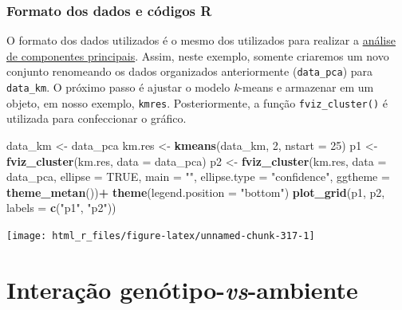 \documentclass[
]{book}
\newenvironment{Shaded}{\begin{snugshade}}{\end{snugshade}}
\newcommand{\DataTypeTok}[1]{\textcolor[rgb]{0.13,0.29,0.53}{#1}}
\newcommand{\DecValTok}[1]{\textcolor[rgb]{0.00,0.00,0.81}{#1}}
\newcommand{\KeywordTok}[1]{\textcolor[rgb]{0.13,0.29,0.53}{\textbf{#1}}}
\newcommand{\NormalTok}[1]{#1}
\newcommand{\OperatorTok}[1]{\textcolor[rgb]{0.81,0.36,0.00}{\textbf{#1}}}
\newcommand{\OtherTok}[1]{\textcolor[rgb]{0.56,0.35,0.01}{#1}}
\newcommand{\StringTok}[1]{\textcolor[rgb]{0.31,0.60,0.02}{#1}}
\numberwithin{equation}{section}
\begin{document}
\hypertarget{formato-dos-dados-e-cuxf3digos-r}{%
\subsection{Formato dos dados e códigos R}\label{formato-dos-dados-e-cuxf3digos-r}}

O formato dos dados utilizados é o mesmo dos utilizados para realizar a \protect\hyperlink{componentes-principais}{análise de componentes principais}. Assim, neste exemplo, somente criaremos um novo conjunto renomeando os dados organizados anteriormente (\texttt{data\_pca}) para \texttt{data\_km}. O próximo passo é ajustar o modelo \emph{k}-means e armazenar em um objeto, em nosso exemplo, \texttt{kmres}. Posteriormente, a função \texttt{fviz\_cluster()} é utilizada para confeccionar o gráfico.

\begin{Shaded}
\begin{Highlighting}[]
\NormalTok{data\_km \textless{}{-}}\StringTok{ }\NormalTok{data\_pca}
\NormalTok{km.res \textless{}{-}}\StringTok{ }\KeywordTok{kmeans}\NormalTok{(data\_km, }\DecValTok{2}\NormalTok{, }\DataTypeTok{nstart =} \DecValTok{25}\NormalTok{)}
\NormalTok{p1 \textless{}{-}}\StringTok{ }\KeywordTok{fviz\_cluster}\NormalTok{(km.res, }\DataTypeTok{data =}\NormalTok{ data\_pca)}
\NormalTok{p2 \textless{}{-}}\StringTok{ }\KeywordTok{fviz\_cluster}\NormalTok{(km.res,}
                   \DataTypeTok{data =}\NormalTok{ data\_pca,}
                   \DataTypeTok{ellipse =} \OtherTok{TRUE}\NormalTok{,}
                   \DataTypeTok{main =} \StringTok{""}\NormalTok{,}
                   \DataTypeTok{ellipse.type =} \StringTok{"confidence"}\NormalTok{,}
                   \DataTypeTok{ggtheme =} \KeywordTok{theme\_metan}\NormalTok{())}\OperatorTok{+}
\StringTok{      }\KeywordTok{theme}\NormalTok{(}\DataTypeTok{legend.position =} \StringTok{"bottom"}\NormalTok{)}
\KeywordTok{plot\_grid}\NormalTok{(p1, p2, }\DataTypeTok{labels =} \KeywordTok{c}\NormalTok{(}\StringTok{"p1"}\NormalTok{, }\StringTok{"p2"}\NormalTok{))}
\end{Highlighting}
\end{Shaded}

\begin{center}\texttt{[image: html\_r\_files/figure-latex/unnamed-chunk-317-1]} \end{center}

\hypertarget{interaction}{%
\chapter{\texorpdfstring{Interação genótipo-\emph{vs}-ambiente}{Interação genótipo-vs-ambiente}}\label{interaction}}
\end{document}
